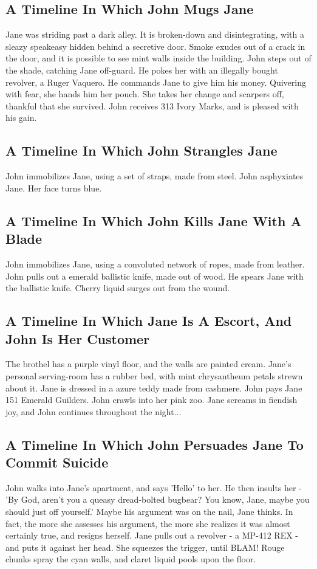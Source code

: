 \documentclass{article}
\begin{document}
\subsection{A Timeline In Which John Mugs Jane}


Jane was striding past a dark alley.
It is broken{-}down and disintegrating, with a sleazy speakeasy hidden behind a secretive door.
Smoke exudes out of a crack in the door, and it is possible to see mint walls inside the building.
John steps out of the shade, catching Jane off{-}guard.
He pokes her with an illegally bought revolver, a Ruger Vaquero.
He commands Jane to give him his money.
Quivering with fear, she hands him her pouch.
She takes her change and scarpers off, thankful that she survived.
John receives 313 Ivory Marks, and is pleased with his gain.
\subsection{A Timeline In Which John Strangles Jane}


John immobilizes Jane, using a set of straps, made from steel.
John asphyxiates Jane.
Her face turns blue.
\subsection{A Timeline In Which John Kills Jane With A Blade}


John immobilizes Jane, using a convoluted network of ropes, made from leather.
John pulls out a emerald ballistic knife, made out of wood.
He spears Jane with the ballistic knife.
Cherry liquid surges out from the wound.
\subsection{A Timeline In Which Jane Is A Escort, And John Is Her Customer}


The brothel has a purple vinyl floor, and the walls are painted cream.
Jane's personal serving{-}room has a rubber bed, with mint chrysantheum petals strewn about it.
Jane is dressed in a azure teddy made from cashmere.
John pays Jane 151 Emerald Guilders.
John crawls into her pink zoo.
Jane screams in fiendish joy, and John continues throughout the night...
\subsection{A Timeline In Which John Persuades Jane To Commit Suicide}


John walks into Jane's apartment, and says 'Hello' to her.
He then insults her {-} 'By God, aren't you a queasy dread{-}bolted bugbear?
You know, Jane, maybe you should just off yourself.'
Maybe his argument was on the nail, Jane thinks.
In fact, the more she assesses his argument, the more she realizes it was almost certainly true, and resigns herself.
Jane pulls out a revolver {-} a MP{-}412 REX {-} and puts it against her head.
She squeezes the trigger, until BLAM!
Rouge chunks spray the cyan walls, and claret liquid pools upon the floor.
\end{document}
